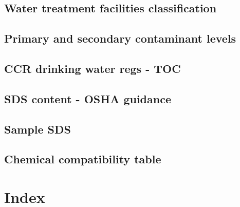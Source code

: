 \documentclass[11pt,fleqn]{book} %
\begin{document}
\chapter{Water treatment facilities classification}\label{appendix:Water Treatment Facilities Classification}


%

\chapter{Primary and secondary contaminant levels}\label{appendix:EPAPrimaryandSecondaryContaminantLevels}


\chapter{CCR drinking water regs - TOC}\label{appendix:CCR Drinking Water Regs - TOC}
\newpage


\chapter{SDS content - OSHA guidance}\label{appendix:SDS Content - OSHA Guidance}


\chapter{Sample SDS}\label{appendix:Sample SDS}


\chapter{Chemical compatibility table}\label{appendix:Chemical compatibility table}
\begin{landscape}

\end{landscape}

\part{Index}
\printindex
\end{document}
